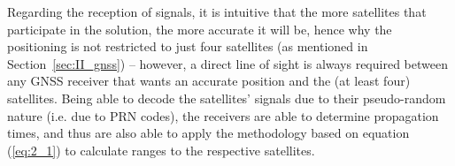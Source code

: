 




Regarding the reception of signals, it is intuitive that the more satellites that participate in the solution, the more accurate it will be, hence why the positioning is not restricted to just four satellites (as mentioned in Section~\ref{sec:II_gnss}) -- however, a direct line of sight is always required between any GNSS receiver that wants an accurate position and the (at least four) satellites. Being able to decode the satellites' signals due to their pseudo-random nature (i.e. due to PRN codes), the receivers are able to determine propagation times, and thus are also able to apply the methodology based on equation (\ref{eq:2_1}) to calculate ranges to the respective satellites.



